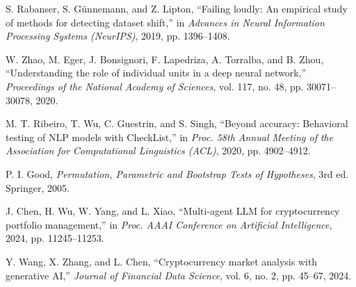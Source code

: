 \begin{thebibliography}{99}
S. Rabanser, S. Günnemann, and Z. Lipton,
``Failing loudly: An empirical study of methods for detecting dataset shift,''
in \textit{Advances in Neural Information Processing Systems (NeurIPS)}, 2019, pp. 1396--1408.

W. Zhao, M. Eger, J. Bonsignori, F. Lapedriza, A. Torralba, and B. Zhou,
``Understanding the role of individual units in a deep neural network,''
\textit{Proceedings of the National Academy of Sciences}, vol. 117, no. 48, pp. 30071--30078, 2020.

M. T. Ribeiro, T. Wu, C. Guestrin, and S. Singh,
``Beyond accuracy: Behavioral testing of NLP models with CheckList,''
in \textit{Proc. 58th Annual Meeting of the Association for Computational Linguistics (ACL)}, 2020, pp. 4902--4912.

P. I. Good,
\textit{Permutation, Parametric and Bootstrap Tests of Hypotheses}, 3rd ed.
Springer, 2005.

J. Chen, H. Wu, W. Yang, and L. Xiao,
``Multi-agent LLM for cryptocurrency portfolio management,''
in \textit{Proc. AAAI Conference on Artificial Intelligence}, 2024, pp. 11245--11253.

Y. Wang, X. Zhang, and L. Chen,
``Cryptocurrency market analysis with generative AI,''
\textit{Journal of Financial Data Science}, vol. 6, no. 2, pp. 45--67, 2024.

\end{thebibliography}
